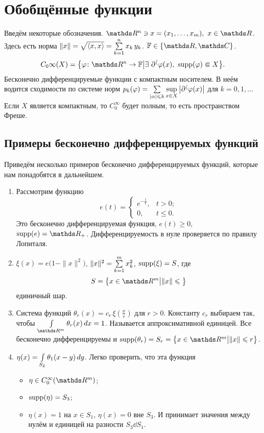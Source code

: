 \section{Обобщённые функции}
Введём некоторые обозначения. $\R^n\ni x=(x_1,\dots,x_m),\ x\in\R$. Здесь есть норма $\|x\| = \sqrt{\langle x,x\rangle} = \sum\limits_{k = 1}^{n} x_k\,y_k$. $\F \in\{\R,\C\}$. 
\[
  C_0\infty(X) = \big\{\phi\colon \R^n\to\F\big|\exists\ \dl^\a\phi(x),\ \supp(\phi)\Subset X\big\}.
\]
Бесконечно дифференцируемые функции с компактным носителем. В неём водится сходимости по системе норм $p_k(\varphi) = \sum\limits_{|\alpha|\leqslant k}\sup\limits_{x\in X}\big|\partial^\langle\varphi(x)\big|$ для $k=0,1,\dots$ Если $X$ является компактным, то $C_0^\infty$ будет полным, то есть пространством Фреше.

\subsection{Примеры бесконечно дифференцируемых функций}
Приведём несколько примеров бесконечно дифференцируемых функций, которые нам понадобятся в дальнейшем.
\begin{enumerate}
\item Рассмотрим функцию
\[
  e(t) = \begin{cases}
e^{-\frac 1t},&t>0;\\
0,&t\le0.
\end{cases}
\]
Это бесконечно дифференцируемая функция, $e(t)\ge0$,  $\supp(e) = \R_+$. Дифференцируемость в нуле проверяется по правилу Лопиталя.
\item $\xi(x) = e\big(1-\|x\|^2\big)$, $\|x\|^2 = \sum\limits_{k = 1}^{m}x_k^2$, $\operatorname{supp}(\xi) = S$, где
\[
  S = \big\{x\in\R^m\big|\|x\|\le\big\}
\]
единичный шар.

\item Система функций $\theta_r(x) = c_r\,\xi\left(\frac xr\right)$ для $r>0$. Константу $c_r$ выбираем так, чтобы $\Gint{\R^m}\theta_r(x)\,dx=1$.
Называется аппроксимативной единицей. Все бесконечно дифференцируемы и $\supp(\theta_r) = S_r = \big\{x\in\R^m\big|\|x\|\le r\big\}$.
\item $\eta(x) = \int\limits_{S_2}\theta_1(x-y)\,dy$. Легко проверить, что эта функция \begin{itemize}
\item $\eta\in C_0^\infty(\R^m)$;
\item $\operatorname{supp}(\eta) = S_3$;
\item $\eta(x)=1$ на $x\in S_1$, $\eta(x)=0$ вне $S_3$. И принимает значения между нулём и единицей на разности $S_3\dd S_1$.
\end{itemize}
\end{enumerate}
